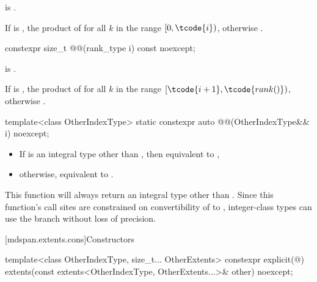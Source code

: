 \begin{itemdescr}
\pnum
\expects
{} is .

\pnum
\returns
If  is ,
the product of  for all $k$ in the range $[0, \tcode{i})$,
otherwise .
\end{itemdescr}

\begin{itemdecl}
constexpr size_t @@(rank_type i) const noexcept;
\end{itemdecl}

\begin{itemdescr}
\pnum
\expects
{} is .

\pnum
\returns
If  is ,
the product of 
for all $k$ in the range $[\tcode{i + 1}, \tcode{rank()})$,
otherwise .
\end{itemdescr}

\begin{itemdecl}
template<class OtherIndexType>
  static constexpr auto @@(OtherIndexType&& i) noexcept;
\end{itemdecl}

\begin{itemdescr}
\pnum
\effects
\begin{itemize}
\item
If  is an integral type other than ,
then equivalent to ,
\item
otherwise, equivalent to .
\end{itemize}
\begin{note}
This function will always return an integral type other than .
Since this function's call sites are constrained on
convertibility of  to ,
integer-class types can use the  branch
without loss of precision.
\end{note}
\end{itemdescr}

[mdspan.extents.cons]{Constructors}

%
\begin{itemdecl}
template<class OtherIndexType, size_t... OtherExtents>
  constexpr explicit(@\seebelow@)
    extents(const extents<OtherIndexType, OtherExtents...>& other) noexcept;
\end{itemdecl}

